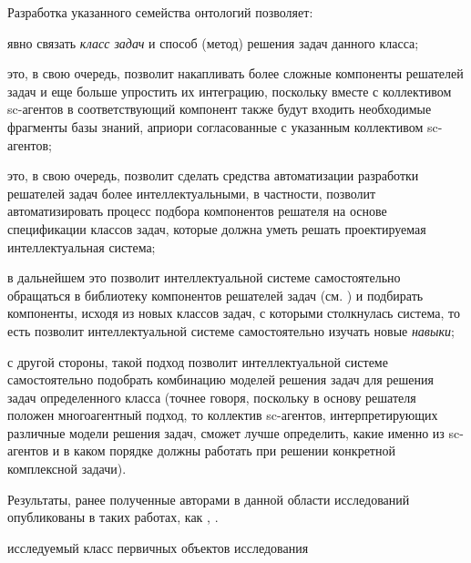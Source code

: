\begin{SCn}
{    	%
    	Разработка указанного семейства онтологий позволяет:
    	\begin{scnitemize}
    		\item явно связать \textit{класс задач} и способ (метод) решения задач данного класса;
    		\item это, в свою очередь, позволит накапливать более сложные компоненты решателей задач и еще больше упростить их интеграцию, поскольку вместе с коллективом sc-агентов в соответствующий компонент также будут входить необходимые фрагменты базы знаний, априори согласованные с указанным коллективом sc-агентов;
    		\item это, в свою очередь, позволит сделать средства автоматизации разработки решателей задач более интеллектуальными, в частности, позволит автоматизировать процесс подбора компонентов решателя на основе спецификации классов задач, которые должна уметь решать проектируемая интеллектуальная система;
    		\item в дальнейшем это позволит интеллектуальной системе самостоятельно обращаться в библиотеку компонентов решателей задач (см. \textit{}) и подбирать компоненты, исходя из новых классов задач, с которыми столкнулась система, то есть позволит интеллектуальной системе самостоятельно изучать новые \textit{навыки};
    		\item с другой стороны, такой подход позволит интеллектуальной системе самостоятельно подобрать комбинацию моделей решения задач для решения задач определенного класса (точнее говоря, поскольку в основу решателя положен многоагентный подход, то коллектив sc-агентов, интерпретирующих различные модели решения задач, сможет лучше определить, какие именно из sc-агентов и в каком порядке должны работать при решении конкретной комплексной задачи).
    	\end{scnitemize}
    	Результаты, ранее полученные авторами в данной области исследований опубликованы в таких работах, как \cite{Shunkevich2022}, \cite{Standart2021}.}
    \begin{scnhaselementrolelist}{исследуемый класс первичных объектов исследования}
        \begin{scnindent}
        \end{scnindent}

\end{scnhaselementrolelist}
\end{SCn}
